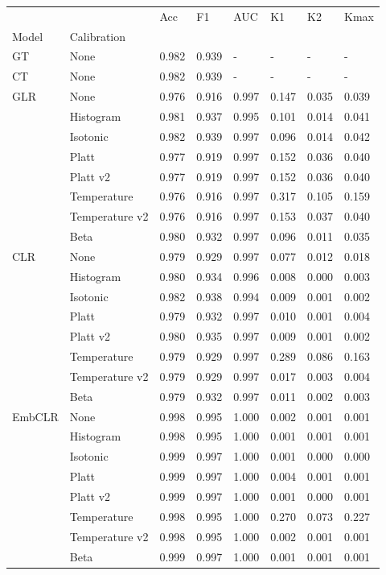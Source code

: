 \begin{tabular}{llllllll}
\toprule
 &  & Acc & F1 & AUC & K1 & K2 & Kmax \\
Model & Calibration &  &  &  &  &  &  \\
\midrule
GT & None & 0.982 & 0.939 & - & - & - & - \\
\cline{1-8}
CT & None & 0.982 & 0.939 & - & - & - & - \\
\cline{1-8}
\multirow[t]{8}{*}{GLR} & None & 0.976 & 0.916 & 0.997 & 0.147 & 0.035 & 0.039 \\
 & Histogram & 0.981 & 0.937 & 0.995 & 0.101 & 0.014 & 0.041 \\
 & Isotonic & 0.982 & 0.939 & 0.997 & 0.096 & 0.014 & 0.042 \\
 & Platt & 0.977 & 0.919 & 0.997 & 0.152 & 0.036 & 0.040 \\
 & Platt v2 & 0.977 & 0.919 & 0.997 & 0.152 & 0.036 & 0.040 \\
 & Temperature & 0.976 & 0.916 & 0.997 & 0.317 & 0.105 & 0.159 \\
 & Temperature v2 & 0.976 & 0.916 & 0.997 & 0.153 & 0.037 & 0.040 \\
 & Beta & 0.980 & 0.932 & 0.997 & 0.096 & 0.011 & 0.035 \\
\cline{1-8}
\multirow[t]{8}{*}{CLR} & None & 0.979 & 0.929 & 0.997 & 0.077 & 0.012 & 0.018 \\
 & Histogram & 0.980 & 0.934 & 0.996 & 0.008 & 0.000 & 0.003 \\
 & Isotonic & 0.982 & 0.938 & 0.994 & 0.009 & 0.001 & 0.002 \\
 & Platt & 0.979 & 0.932 & 0.997 & 0.010 & 0.001 & 0.004 \\
 & Platt v2 & 0.980 & 0.935 & 0.997 & 0.009 & 0.001 & 0.002 \\
 & Temperature & 0.979 & 0.929 & 0.997 & 0.289 & 0.086 & 0.163 \\
 & Temperature v2 & 0.979 & 0.929 & 0.997 & 0.017 & 0.003 & 0.004 \\
 & Beta & 0.979 & 0.932 & 0.997 & 0.011 & 0.002 & 0.003 \\
\cline{1-8}
\multirow[t]{8}{*}{EmbCLR} & None & 0.998 & 0.995 & 1.000 & 0.002 & 0.001 & 0.001 \\
 & Histogram & 0.998 & 0.995 & 1.000 & 0.001 & 0.001 & 0.001 \\
 & Isotonic & 0.999 & 0.997 & 1.000 & 0.001 & 0.000 & 0.000 \\
 & Platt & 0.999 & 0.997 & 1.000 & 0.004 & 0.001 & 0.001 \\
 & Platt v2 & 0.999 & 0.997 & 1.000 & 0.001 & 0.000 & 0.001 \\
 & Temperature & 0.998 & 0.995 & 1.000 & 0.270 & 0.073 & 0.227 \\
 & Temperature v2 & 0.998 & 0.995 & 1.000 & 0.002 & 0.001 & 0.001 \\
 & Beta & 0.999 & 0.997 & 1.000 & 0.001 & 0.001 & 0.001 \\
\cline{1-8}
\bottomrule
\end{tabular}
